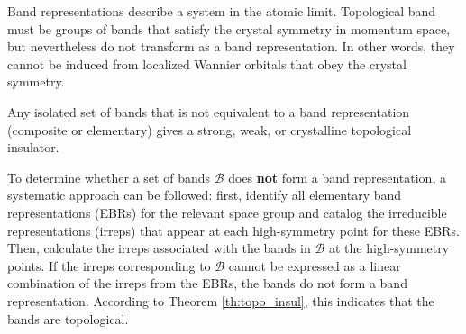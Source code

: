 Band representations describe a system in the atomic limit. Topological band must be groups of bands that satisfy the crystal symmetry in momentum space, but nevertheless do not transform as a band representation. In other words, they cannot be induced from localized Wannier orbitals that obey the crystal symmetry.

\begin{theorem} \label{th:topo_insul}
Any isolated set of bands that is not equivalent to a band representation (composite or elementary) gives a strong, weak, or crystalline topological insulator.
\end{theorem}


%
%
%


To determine whether a set of bands \(\mathcal{B}\) does \textbf{not} form a band representation, a systematic approach can be followed: first, identify all elementary band representations (EBRs) for the relevant space group and catalog the irreducible representations (irreps) that appear at each high-symmetry point for these EBRs. Then, calculate the irreps associated with the bands in \(\mathcal{B}\) at the high-symmetry points. If the irreps corresponding to \(\mathcal{B}\) cannot be expressed as a linear combination of the irreps from the EBRs, the bands do not form a band representation. According to Theorem \ref{th:topo_insul}, this indicates that the bands are topological.

